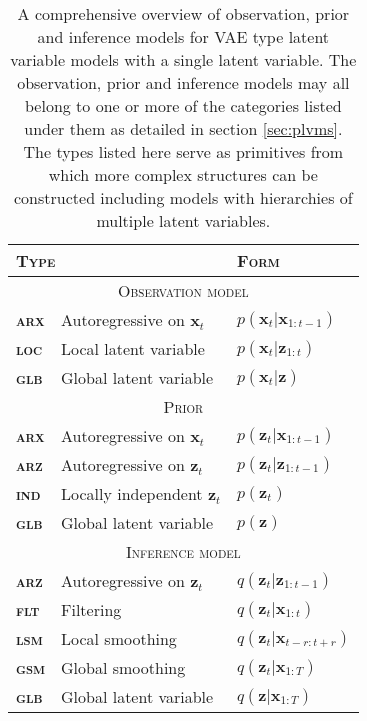 {\begin{table}[t!]
\caption{A comprehensive overview of observation, prior and inference models for VAE type latent variable models with a single latent variable. The observation, prior and inference models may all belong to one or more of the categories listed under them as detailed in section \ref{sec:plvms}. The types listed here serve as primitives from which more complex structures can be constructed including models with hierarchies of multiple latent variables.}
\label{tab:lvm-model-primitives}
\begin{center}
    \begin{tabular}{ l l l } 
        \toprule
        \multicolumn{2}{l}{\textbf{\textsc{Type}}} & \textbf{\textsc{Form}} \\
        \midrule
        \multicolumn{3}{c}{\textsc{Observation model}} \\
        \midrule
        \textbf{\textsc{arx}} & Autoregressive on $\mathbf{x}_t$      & $p(\mathbf{x}_t|\mathbf{x}_{1:t-1})$ \\
        \textbf{\textsc{loc}} & Local latent variable                 & $p(\mathbf{x}_{t}|\mathbf{z}_{1:t})$ \\
        \textbf{\textsc{glb}} & Global latent variable                & $p(\mathbf{x}_{t}|\mathbf{z})$ \\
        \midrule
        \multicolumn{3}{c}{\textsc{Prior}} \\
        \midrule
        \textbf{\textsc{arx}} & Autoregressive on $\mathbf{x}_t$      & $p(\mathbf{z}_t|\mathbf{x}_{1:t-1})$ \\
        \textbf{\textsc{arz}} & Autoregressive on $\mathbf{z}_t$      & $p(\mathbf{z}_t|\mathbf{z}_{1:t-1})$ \\
        \textbf{\textsc{ind}} & Locally independent $\mathbf{z}_t$                 & $p(\mathbf{z}_t)$ \\
        \textbf{\textsc{glb}} & Global latent variable                & $p(\mathbf{z})$ \\
        \midrule
        \multicolumn{3}{c}{\textsc{Inference model}} \\
        \midrule
        \textbf{\textsc{arz}} & Autoregressive on $\mathbf{z}_t$      & $q(\mathbf{z}_t|\mathbf{z}_{1:t-1})$ \\
        \textbf{\textsc{flt}} & Filtering                             & $q(\mathbf{z}_t|\mathbf{x}_{1:t})$ \\
        \textbf{\textsc{lsm}} & Local smoothing                       & $q(\mathbf{z}_t|\mathbf{x}_{t-r:t+r})$ \\
        \textbf{\textsc{gsm}} & Global smoothing                      & $q(\mathbf{z}_t|\mathbf{x}_{1:T})$ \\
        \textbf{\textsc{glb}} & Global latent variable                & $q(\mathbf{z}|\mathbf{x}_{1:T})$ \\
        \bottomrule
    \end{tabular}
    \end{center}
\end{table}

}

